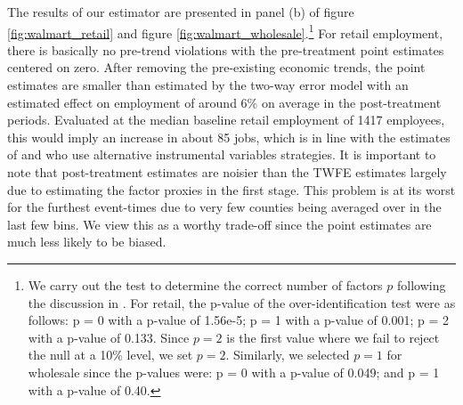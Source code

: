 \documentclass[12pt]{article}
\begin{document}
\begin{figure}
\end{figure}

The results of our estimator are presented in panel (b) of figure \ref{fig:walmart_retail} and figure \ref{fig:walmart_wholesale}.\footnote{We carry out the test to determine the correct number of factors $p$ following the discussion in \citet{Ahn_Lee_Schmidt_2013}. For retail, the p-value of the over-identification test were as follows: p = 0 with a p-value of 1.56e-5; p = 1 with a p-value of 0.001; p = 2 with a p-value of 0.133.  Since $p = 2$ is the first value where we fail to reject the null at a 10\% level, we set $p = 2$. Similarly, we selected $p = 1$ for wholesale since the p-values were: p = 0 with a p-value of 0.049; and p = 1 with a p-value of 0.40.} For retail employment, there is basically no pre-trend violations with the pre-treatment point estimates centered on zero. After removing the pre-existing economic trends, the point estimates are smaller than estimated by the two-way error model with an estimated effect on employment of around 6\% on average in the post-treatment periods. Evaluated at the median baseline retail employment of 1417 employees, this would imply an increase in about 85 jobs, which is in line with the estimates of \citet{basker2005job} and \citet{stapp2014Walmart} who use alternative instrumental variables strategies. It is important to note that post-treatment estimates are noisier than the TWFE estimates largely due to estimating the factor proxies in the first stage. This problem is at its worst for the furthest event-times due to very few counties being averaged over in the last few bins. We view this as a worthy trade-off since the point estimates are much less likely to be biased. 
\end{document}
